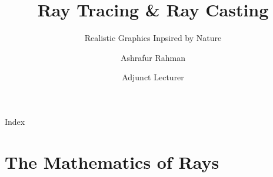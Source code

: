 


\title{Ray Tracing \& Ray Casting}
\subtitle{Realistic Graphics Inpsired by Nature}
\author{\large Ashrafur Rahman}
\date{\small Adjunct Lecturer}



\begin{frame}
    \titlepage
\end{frame}

\begin{frame}{Index}
    \footnotesize
    \vspace{1cm}
    \tableofcontents
\end{frame}



\section{The Mathematics of Rays}


